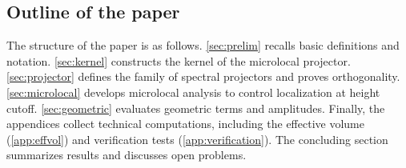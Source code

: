 \subsection{Outline of the paper}\label{subsec:outline}

The structure of the paper is as follows. 
\cref{sec:prelim} recalls basic definitions and notation. 
\cref{sec:kernel} constructs the kernel of the microlocal projector. 
\cref{sec:projector} defines the family of spectral projectors and proves orthogonality. 
\cref{sec:microlocal} develops microlocal analysis to control localization at height cutoff. 
\cref{sec:geometric} evaluates geometric terms and amplitudes. 
Finally, the appendices collect technical computations, 
including the effective volume (\cref{app:effvol}) and verification tests (\cref{app:verification}). 
The concluding section summarizes results and discusses open problems. 
